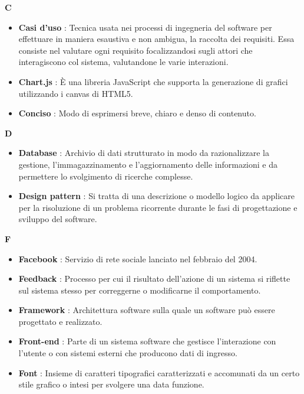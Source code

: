 \newpage
{\huge \textbf{C}}
\begin{flushleft}
\begin{itemize}[label={}]
\item \textbf{Casi d'uso} : Tecnica usata nei processi di ingegneria del software per effettuare in maniera esaustiva e non ambigua, la raccolta dei requisiti. Essa consiste nel valutare ogni requisito focalizzandosi sugli attori che interagiscono col sistema, valutandone le varie interazioni.
\item \textbf{Chart.js} : È una libreria JavaScript che supporta la generazione di grafici utilizzando i canvas di HTML5.
\item \textbf{Conciso} : Modo di esprimersi breve, chiaro e denso di contenuto.
\end{itemize}
\end{flushleft}
\newpage
{\huge \textbf{D}}
\begin{flushleft}
\begin{itemize}[label={}]
\item \textbf{Database} :  Archivio di dati strutturato in modo da razionalizzare la gestione, l'immagazzinamento e l'aggiornamento delle informazioni e da permettere lo svolgimento di ricerche complesse.
\item \textbf{Design pattern} : Si tratta di una descrizione o modello logico da applicare per la risoluzione di un problema ricorrente durante le fasi di progettazione e sviluppo del software.
\end{itemize}
\end{flushleft}
\newpage
{\huge \textbf{F}}
\begin{flushleft}
\begin{itemize}[label={}]
\item \textbf{Facebook} : Servizio di rete sociale lanciato nel febbraio del 2004.
\item \textbf{Feedback} : Processo per cui il risultato dell'azione di un sistema si riflette sul sistema stesso per correggerne o modificarne il comportamento.
\item \textbf{Framework} : Architettura software sulla quale un software può essere progettato e realizzato.
\item \textbf{Front-end} : Parte di un sistema software che gestisce l'interazione con l'utente o con sistemi esterni che producono dati di ingresso.
\item \textbf{Font} : Insieme di caratteri tipografici caratterizzati e accomunati da un certo stile grafico o intesi per svolgere una data funzione.
\end{itemize}
\end{flushleft}
